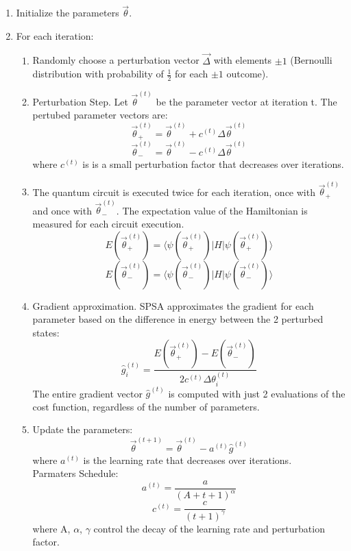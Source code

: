 \documentclass{article}
\begin{document}
    \begin{enumerate}
    \item Initialize the parameters \(\vec{\theta}\).
    \item For each iteration:
    \begin{enumerate}
        \item Randomly choose a perturbation vector \(\vec{\Delta}\) with elements \(\pm 1\) (Bernoulli distribution with probability of \(\frac{1}{2}\) for each \(\pm 1\) outcome).
        \item Perturbation Step. Let \(\vec{\theta}^{(t)}\) be the parameter vector at iteration t. The pertubed parameter vectors are:
        \[\vec{\theta}^{(t)}_+ = \vec{\theta}^{(t)} + c^{(t)} \Delta\vec{\theta}^{(t)}\]
        \[\vec{\theta}^{(t)}_- = \vec{\theta}^{(t)} - c^{(t)} \Delta\vec{\theta}^{(t)}\]
        where \(c^{(t)}\) is is a small perturbation factor that decreases over iterations. 
        \item The quantum circuit is executed twice for each iteration, once with \(\vec{\theta}^{(t)}_+\) and once with \(\vec{\theta}^{(t)}_-\). The expectation value of the Hamiltonian is measured for each circuit execution.
        \[E(\vec{\theta}^{(t)}_+)= \langle \psi(\vec{\theta}^{(t)}_+)|H|\psi(\vec{\theta}^{(t)}_+)\rangle\]
        \[E(\vec{\theta}^{(t)}_-)= \langle \psi(\vec{\theta}^{(t)}_-)|H|\psi(\vec{\theta}^{(t)}_-)\rangle\]
        \item Gradient approximation. SPSA approximates the gradient for each parameter based on the difference in energy between the 2 perturbed states:
        \[\hat{g}^{(t)}_i = \frac{E(\vec{\theta}^{(t)}_+) - E(\vec{\theta}^{(t)}_-)}{2c^{(t)}\Delta\theta^{(t)}_i}\]
        The entire gradient vector \(\hat{g}^{(t)}\) is computed with just 2 evaluations of the cost function, regardless of the number of parameters. 
        \item Update the parameters:
        \[\vec{\theta}^{(t+1)} = \vec{\theta}^{(t)}-a^{(t)}\hat{g}^{(t)}\]
        where \(a^{(t)}\) is the learning rate that decreases over iterations.\\
        Parmaters Schedule:        
        \[a^{(t)} = \frac{a}{(A + t + 1)^\alpha}\]
        \[c^{(t)} = \frac{c}{(t+1)^\gamma}\]
        where A, \(\alpha\), \(\gamma\) control the decay of the learning rate and perturbation factor.
    \end{enumerate} 
    \end{enumerate}
\end{document}
